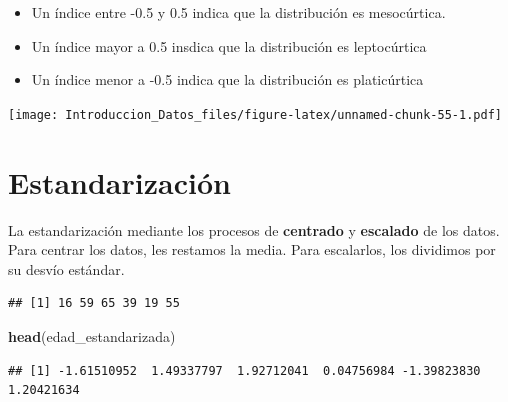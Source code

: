 \documentclass[spanish,]{book}
\newenvironment{Shaded}{\begin{snugshade}}{\end{snugshade}}
\newcommand{\KeywordTok}[1]{\textcolor[rgb]{0.13,0.29,0.53}{\textbf{#1}}}
\newcommand{\StringTok}[1]{\textcolor[rgb]{0.31,0.60,0.02}{#1}}
\newcommand{\OperatorTok}[1]{\textcolor[rgb]{0.81,0.36,0.00}{\textbf{#1}}}
\newcommand{\NormalTok}[1]{#1}
\providecommand{\tightlist}{%
  \setlength{\itemsep}{0pt}\setlength{\parskip}{0pt}}
\begin{document}
\begin{itemize}
\tightlist
\item
  Un índice entre -0.5 y 0.5 indica que la distribución es mesocúrtica.
\item
  Un índice mayor a 0.5 insdica que la distribución es leptocúrtica
\item
  Un índice menor a -0.5 indica que la distribución es platicúrtica
\end{itemize}

\texttt{[image: Introduccion\_Datos\_files/figure-latex/unnamed-chunk-55-1.pdf]}

\section{Estandarización}\label{estandarizacion}

La estandarización mediante los procesos de \textbf{centrado} y
\textbf{escalado} de los datos. Para centrar los datos, les restamos la
media. Para escalarlos, los dividimos por su desvío estándar.

\begin{Shaded}
\end{Shaded}

\begin{verbatim}
## [1] 16 59 65 39 19 55
\end{verbatim}

\begin{Shaded}
\begin{Highlighting}[]
\KeywordTok{head}\NormalTok{(edad_estandarizada)}
\end{Highlighting}
\end{Shaded}

\begin{verbatim}
## [1] -1.61510952  1.49337797  1.92712041  0.04756984 -1.39823830  1.20421634
\end{verbatim}
\end{document}

